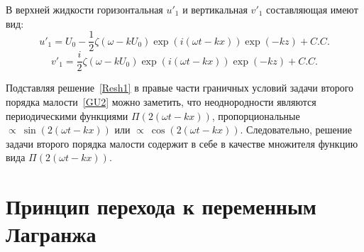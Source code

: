 В верхней жидкости горизонтальная  $ u'_{1} $ и вертикальная $ v'_{1} $ составляющая имеют вид:
\begin{equation}
u'_{1}=U_{0}-\dfrac{1}{2}\zeta \left( \omega - k U_{0}\right) \exp \left( i \left( \omega t -k x\right) \right) \exp \left( -k z \right) +C.C.
\label{u1'}
\end{equation}
\begin{equation}
v'_{1}=\dfrac{i}{2}\zeta \left( \omega - k U_{0}\right)  \exp \left( i \left( \omega t -k x\right) \right) \exp \left( -k z \right) +C.C.
\label{v1'}
\end{equation}

Подставляя решение~\eqref{Resh1} в правые части граничных условий задачи второго порядка малости~\eqref{GU2} можно заметить, что неоднородности являются периодическими функциями $ \Pi \left(2 \left( \omega t-k x\right) \right) $, пропорциональные $ \propto~\!\!\!\!\sin \left(2 \left( \omega t-k x\right) \right) $ или $ \propto~\!\!\!\!\cos \left(2 \left( \omega t-k x\right) \right) $. Следовательно, решение задачи второго порядка малости содержит в себе в качестве множителя функцию вида $ \Pi \left(2 \left( \omega t-k x\right) \right) $. 

\section{Принцип перехода к переменным Лагранжа}\label{sec:Pereh}

